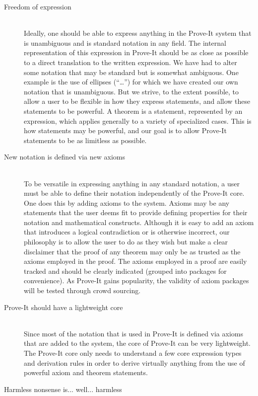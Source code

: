 \documentclass{article}[12pt]
\begin{document}
\begin{description}
\item[Freedom of expression] \hfill \\
  Ideally, one should be able to express anything in the Prove-It system that is unambiguous and is standard notation in any field.  The internal representation of this expression in Prove-It should be as close as possible to a direct translation to the written expression.  We have had to alter some notation that may be standard but is somewhat ambiguous.  One example is the use of ellipses (“…”) for which we have created our own notation that is unambiguous.  But we strive, to the extent possible, to allow a user to be flexible in how they express statements, and allow these statements to be powerful.  A theorem is a statement, represented by an expression, which applies generally to a variety of specialized cases.  This is how statements may be powerful, and our goal is to allow Prove-It statements to be as limitless as possible.
\item[New notation is defined via new axioms] \hfill \\
  To be versatile in expressing anything in any standard notation, a user must be able to define their notation independently of the Prove-It core.  One does this by adding axioms to the system.  Axioms may be any statements that the user deems fit to provide defining properties for their notation and mathematical constructs.  Although it is easy to add an axiom that introduces a logical contradiction or is otherwise incorrect, our philosophy is to allow the user to do as they wish but make a clear disclaimer that the proof of any theorem may only be as trusted as the axioms employed in the proof.  The axioms employed in a proof are easily tracked and should be clearly indicated (grouped into packages for convenience).  As Prove-It gains popularity, the validity of axiom packages will be tested through crowd sourcing.
\item[Prove-It should have a lightweight core] \hfill \\
  Since most of the notation that is used in Prove-It is defined via axioms that are added to the system, the core of Prove-It can be very lightweight.  The Prove-It core only needs to understand a few core expression types and derivation rules in order to derive virtually anything from the use of powerful axiom and theorem statements.
\item[Harmless nonsense is... well... harmless] \hfill \\

\end{description}
\end{document}
